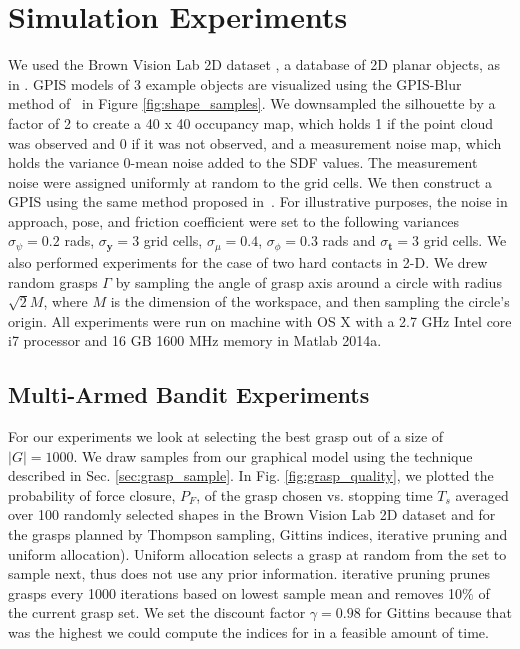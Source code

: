 \documentclass[10pt, conference]{ieeeconf}      %
\newcommand{\bt}{\mathbf{t}}
\newcommand{\by}{\mathbf{y}}
\begin{document}
\section{Simulation Experiments}
We used the Brown Vision Lab 2D dataset \cite{brown}, a database of 2D planar objects, as in \cite{christopoulos2007handling}.
GPIS models of 3 example objects are visualized using the GPIS-Blur method of~\cite{mahler2015gp} in Figure \ref{fig:shape_samples}.
We downsampled the silhouette by a factor of 2 to create a 40 x 40 occupancy map, which holds 1 if the point cloud was observed and 0 if it was not observed, and a measurement noise map, which holds the variance 0-mean noise added to the SDF values.
The measurement noise were assigned uniformly at random to the grid cells.
We then construct a GPIS using the same method proposed in~\cite{mahler2015gp}.
For illustrative purposes, the noise in approach, pose, and friction coefficient were set to the following variances $\sigma_{\psi} = 0.2$ rads, $\sigma_{\by} = 3$ grid cells, $\sigma_{\mu} = 0.4$, $\sigma_{\phi} = 0.3$ rads and $\sigma_{\bt} = 3$ grid cells.
We also performed experiments for the case of two hard contacts in 2-D.
We drew random grasps $\Gamma$ by sampling the angle of grasp axis around a circle with radius $\sqrt{2} M$, where $M$ is the dimension of the workspace, and then sampling the circle's origin. All experiments were run on machine with OS X with a 2.7 GHz Intel core i7 processor and 16 GB 1600 MHz memory in Matlab 2014a.





\subsection{Multi-Armed Bandit Experiments}
For our experiments we look at selecting the best grasp out of a size of $|G| = 1000$. We draw samples from our graphical model using the technique described in Sec.  \ref{sec:grasp_sample}. In Fig. \ref{fig:grasp_quality}, we plotted the probability of force closure, $P_F$, of the grasp chosen vs. stopping time $T_s$ averaged over 100 randomly selected shapes in the Brown Vision Lab 2D dataset and for the grasps planned by Thompson sampling, Gittins indices, iterative pruning \cite{kehoe2012toward} and uniform allocation). Uniform allocation selects a grasp at random from the set to sample next, thus does not use any prior information. iterative pruning prunes grasps every 1000 iterations based on lowest sample mean and removes 10$\%$ of the current grasp set.  We set the discount factor $\gamma =0.98$ for Gittins because that was the highest we could compute the indices for in a feasible amount of time. 
\end{document}
